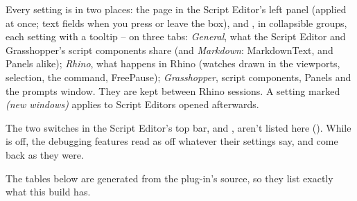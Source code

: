 Every setting is in two places: the  page in the Script Editor's left panel (applied at once; text fields when
you press  or leave the box), and , in collapsible groups, each setting
with a tooltip -- on three tabs: \emph{General}, what the Script Editor and Grasshopper's script components share
(and \emph{Markdown}: MarkdownText,  and Panels alike); \emph{Rhino}, what happens in Rhino (watches drawn in the
viewports, selection, the  command, FreePause); \emph{Grasshopper}, script components, Panels and
the prompts window. They are kept between Rhino sessions. A setting marked \emph{(new windows)} applies to Script Editors
opened afterwards.

The two switches in the Script Editor's top bar,  and , aren't listed here (). While
 is off, the debugging features read as off whatever their settings say, and come back as they were.

The tables below are generated from the plug-in's source, so they list exactly what this build has.
